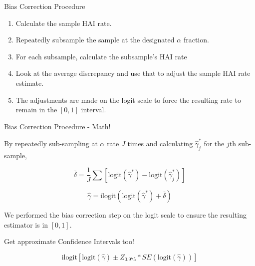 \documentclass[ignorenonframetext,]{beamer}
\providecommand{\tightlist}{%
  \setlength{\itemsep}{0pt}\setlength{\parskip}{0pt}}
\begin{document}
\begin{frame}{Bias Correction Procedure}
\protect\hypertarget{bias-correction-procedure}{}

\begin{enumerate}
\tightlist
\item
  Calculate the sample HAI rate.
\item
  Repeatedly subsample the sample at the designated \(\alpha\) fraction.
\item
  For each subsample, calculate the subsample's HAI rate
\item
  Look at the average discrepancy and use that to adjust the sample HAI
  rate estimate.
\item
  The adjustments are made on the logit scale to force the resulting
  rate to remain in the \([0,1]\) interval.
\end{enumerate}

\end{frame}

\begin{frame}{Bias Correction Procedure - Math!}
\protect\hypertarget{bias-correction-procedure---math}{}

By repeatedly sub-sampling at \(\alpha\) rate \(J\) times and
calculating \(\widehat{\gamma}^*_j\) for the \(j\)th sub-sample,

\[\bar{\delta} = \frac{1}{J}\sum\left[ \textrm{logit}(\widehat\gamma^*) - \textrm{logit}(\widehat\gamma^*_j) \right]\]

\[\widehat{\gamma} = \textrm{ilogit}\left( \textrm{logit}( \widehat{\gamma}^* ) + \bar\delta \right)\]

We performed the bias correction step on the logit scale to ensure the
resulting estimator is in \([0,1]\).

\end{frame}

\begin{frame}{Get approximate Confidence Intervals too!}
\protect\hypertarget{get-approximate-confidence-intervals-too}{}


\[\textrm{ilogit} \left[ \textrm{logit}(\widehat\gamma) \pm Z_{0.975}*SE(\textrm{logit}(\widehat\gamma))\right]\]

\end{frame}
\end{document}
